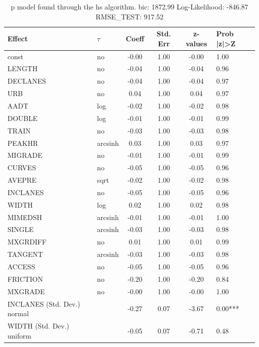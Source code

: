 \begin{table}
	\caption{p model found through the hs algorithm. bic: 1872.99 Log-Likelihood: -846.87 RMSE_TEST: 917.52}
	\begin{center}
		\begin{tabular}{|l|l|c|c|c|l|}
			\hline
			Effect & $\tau$ & Coeff & Std. Err & z-values & Prob |z|>Z \\
			\hline
			const & no & -0.00 & 1.00 & -0.00 & 1.00 \\
			\hline
			LENGTH & no & -0.04 & 1.00 & -0.04 & 0.96 \\
			\hline
			DECLANES & no & -0.04 & 1.00 & -0.04 & 0.97 \\
			\hline
			URB & no & 0.04 & 1.00 & 0.04 & 0.97 \\
			\hline
			AADT & log & -0.02 & 1.00 & -0.02 & 0.98 \\
			\hline
			DOUBLE & log & -0.01 & 1.00 & -0.01 & 0.99 \\
			\hline
			TRAIN & no & -0.03 & 1.00 & -0.03 & 0.98 \\
			\hline
			PEAKHR & arcsinh & 0.03 & 1.00 & 0.03 & 0.97 \\
			\hline
			MIGRADE & no & -0.01 & 1.00 & -0.01 & 0.99 \\
			\hline
			CURVES & no & -0.05 & 1.00 & -0.05 & 0.96 \\
			\hline
			AVEPRE & sqrt & -0.02 & 1.00 & -0.02 & 0.98 \\
			\hline
			INCLANES & no & -0.05 & 1.00 & -0.05 & 0.96 \\
			\hline
			WIDTH & log & 0.02 & 1.00 & 0.02 & 0.98 \\
			\hline
			MIMEDSH & arcsinh & -0.01 & 1.00 & -0.01 & 1.00 \\
			\hline
			SINGLE & arcsinh & -0.03 & 1.00 & -0.03 & 0.98 \\
			\hline
			MXGRDIFF & no & 0.01 & 1.00 & 0.01 & 0.99 \\
			\hline
			TANGENT & arcsinh & -0.03 & 1.00 & -0.03 & 0.98 \\
			\hline
			ACCESS & no & -0.05 & 1.00 & -0.05 & 0.96 \\
			\hline
			FRICTION & no & -0.20 & 1.00 & -0.20 & 0.84 \\
			\hline
			MXGRADE & no & -0.00 & 1.00 & -0.00 & 1.00 \\
			\hline
			INCLANES (Std. Dev.) normal &  & -0.27 & 0.07 & -3.67 & 0.00*** \\
			\hline
			WIDTH (Std. Dev.) uniform &  & -0.05 & 0.07 & -0.71 & 0.48 \\

\end{tabular}
\end{center}
\end{table}
